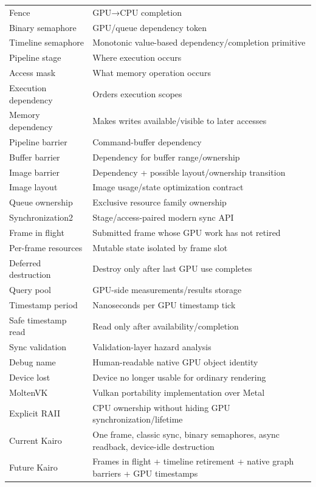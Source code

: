 {\begin{longtable}[]{@{}
  >{\raggedright\arraybackslash}p{}
  >{\raggedright\arraybackslash}p{}@{}}
Fence & GPU→CPU completion \\
Binary semaphore & GPU/queue dependency token \\
Timeline semaphore & Monotonic value-based dependency/completion primitive \\
Pipeline stage & Where execution occurs \\
Access mask & What memory operation occurs \\
Execution dependency & Orders execution scopes \\
Memory dependency & Makes writes available/visible to later accesses \\
Pipeline barrier & Command-buffer dependency \\
Buffer barrier & Dependency for buffer range/ownership \\
Image barrier & Dependency + possible layout/ownership transition \\
Image layout & Image usage/state optimization contract \\
Queue ownership & Exclusive resource family ownership \\
Synchronization2 & Stage/access-paired modern sync API \\
Frame in flight & Submitted frame whose GPU work has not retired \\
Per-frame resources & Mutable state isolated by frame slot \\
Deferred destruction & Destroy only after last GPU use completes \\
Query pool & GPU-side measurements/results storage \\
Timestamp period & Nanoseconds per GPU timestamp tick \\
Safe timestamp read & Read only after availability/completion \\
Sync validation & Validation-layer hazard analysis \\
Debug name & Human-readable native GPU object identity \\
Device lost & Device no longer usable for ordinary rendering \\
MoltenVK & Vulkan portability implementation over Metal \\
Explicit RAII & CPU ownership without hiding GPU synchronization/lifetime \\
Current Kairo & One frame, classic sync, binary semaphores, async readback, device-idle destruction \\
Future Kairo & Frames in flight + timeline retirement + native graph barriers + GPU timestamps \\
\end{longtable}
}

